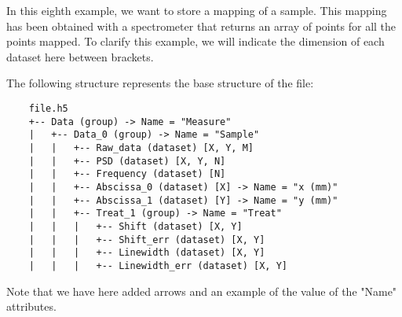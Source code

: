 In this eighth example, we want to store a mapping of a sample. This mapping has been obtained with a spectrometer that returns an array of points for all the points mapped. To clarify this example, we will indicate the dimension of each dataset here between brackets.

The following structure represents the base structure of the file:
\begin{verbatim}
    file.h5
    +-- Data (group) -> Name = "Measure"
    |   +-- Data_0 (group) -> Name = "Sample"
    |   |   +-- Raw_data (dataset) [X, Y, M]
    |   |   +-- PSD (dataset) [X, Y, N]
    |   |   +-- Frequency (dataset) [N]
    |   |   +-- Abscissa_0 (dataset) [X] -> Name = "x (mm)"
    |   |   +-- Abscissa_1 (dataset) [Y] -> Name = "y (mm)"
    |   |   +-- Treat_1 (group) -> Name = "Treat"
    |   |   |   +-- Shift (dataset) [X, Y]
    |   |   |   +-- Shift_err (dataset) [X, Y]
    |   |   |   +-- Linewidth (dataset) [X, Y]
    |   |   |   +-- Linewidth_err (dataset) [X, Y]
\end{verbatim}
Note that we have here added arrows and an example of the value of the "Name" attributes.